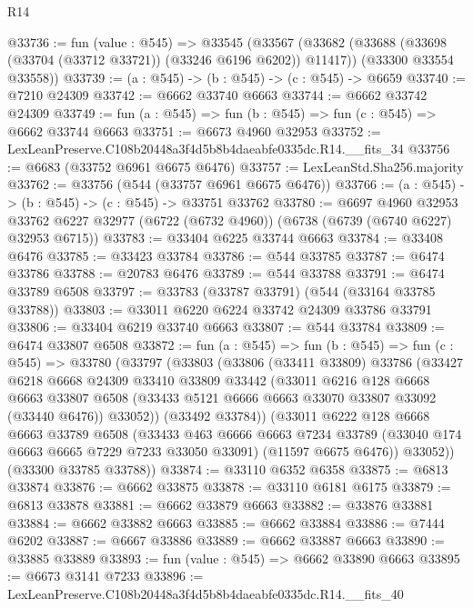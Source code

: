 \begin{lexlean}{R14}
\begin{coremodule}
@33736 := fun (value : @545) =>
  @33545
    (@33567
      (@33682 (@33688 (@33698 (@33704 (@33712 @33721)) (@33246 @6196 @6202)) @11417))
      (@33300 @33554 @33558))
@33739 := (a : @545) -> (b : @545) -> (c : @545) -> @6659
@33740 := @7210 @24309
@33742 := @6662 @33740 @6663
@33744 := @6662 @33742 @24309
@33749 := fun (a : @545) => fun (b : @545) => fun (c : @545) => @6662 @33744 @6663
@33751 := @6673 @4960 @32953
@33752 := LexLeanPreserve.C108b20448a3f4d5b8b4daeabfe0335dc.R14.__fits_34
@33756 := @6683 (@33752 @6961 @6675 @6476)
@33757 := LexLeanStd.Sha256.majority
@33762 := @33756 (@544 (@33757 @6961 @6675 @6476))
@33766 := (a : @545) -> (b : @545) -> (c : @545) -> @33751 @33762
@33780 := @6697
    @4960
    @32953
    @33762
    @6227
    @32977
    (@6722 (@6732 @4960))
    (@6738 (@6739 (@6740 @6227) @32953 @6715))
@33783 := @33404 @6225 @33744 @6663
@33784 := @33408 @6476
@33785 := @33423 @33784
@33786 := @544 @33785
@33787 := @6474 @33786
@33788 := @20783 @6476
@33789 := @544 @33788
@33791 := @6474 @33789 @6508
@33797 := @33783 (@33787 @33791) (@544 (@33164 @33785 @33788))
@33803 := @33011 @6220 @6224 @33742 @24309 @33786 @33791
@33806 := @33404 @6219 @33740 @6663
@33807 := @544 @33784
@33809 := @6474 @33807 @6508
@33872 := fun (a : @545) =>
  fun (b : @545) =>
  fun (c : @545) =>
  @33780
    (@33797
      (@33803
        (@33806
          (@33411 @33809)
          @33786
          (@33427
            @6218
            @6668
            @24309
            @33410
            @33809
            @33442
            (@33011
              @6216
              @128
              @6668
              @6663
              @33807
              @6508
              (@33433 @5121 @6666 @6663 @33070 @33807 @33092 (@33440 @6476))
              @33052))
          (@33492 @33784))
        (@33011
          @6222
          @128
          @6668
          @6663
          @33789
          @6508
          (@33433
            @463
            @6666
            @6663
            @7234
            @33789
            (@33040 @174 @6663 @6665 @7229 @7233 @33050 @33091)
            (@11597 @6675 @6476))
          @33052))
      (@33300 @33785 @33788))
@33874 := @33110 @6352 @6358
@33875 := @6813 @33874
@33876 := @6662 @33875
@33878 := @33110 @6181 @6175
@33879 := @6813 @33878
@33881 := @6662 @33879 @6663
@33882 := @33876 @33881
@33884 := @6662 @33882 @6663
@33885 := @6662 @33884
@33886 := @7444 @6202
@33887 := @6667 @33886
@33889 := @6662 @33887 @6663
@33890 := @33885 @33889
@33893 := fun (value : @545) => @6662 @33890 @6663
@33895 := @6673 @3141 @7233
@33896 := LexLeanPreserve.C108b20448a3f4d5b8b4daeabfe0335dc.R14.__fits_40

\end{coremodule}
\end{lexlean}
